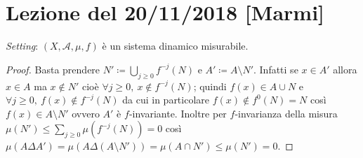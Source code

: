 \section{Lezione del 20/11/2018 [Marmi]}

\emph{Setting}: $ (X, \mathcal{A}, \mu, f) $ è un sistema dinamico misurabile.

\begin{proof}
    Basta prendere $ N' \coloneqq \bigcup_{j } f^{-j}(N) $ e $ A' \coloneqq A \setminus N' $. Infatti se $ x \in A' $ allora $ x \in A $ ma $ x \notin N' $ cioè $ \forall j , \ x \notin f^{-j}(N) $; quindi $ f(x) \in A \cup N $ e $ \forall j , \ f(x) \notin f^{-j}(N) $ da cui in particolare $ f(x) \notin f^0(N) = N $ così $ f(x) \in A \setminus N' $ ovvero $ A' $ è $ f $-invariante. Inoltre per $ f $-invarianza della misura $ \mu(N') \leq \sum_{j } \mu(f^{-j}(N)) = 0 $ così $ \mu(A\Delta A') = \mu(A\Delta(A\setminus N')) = \mu(A \cap N') \leq \mu(N') = 0 $.
\end{proof}

